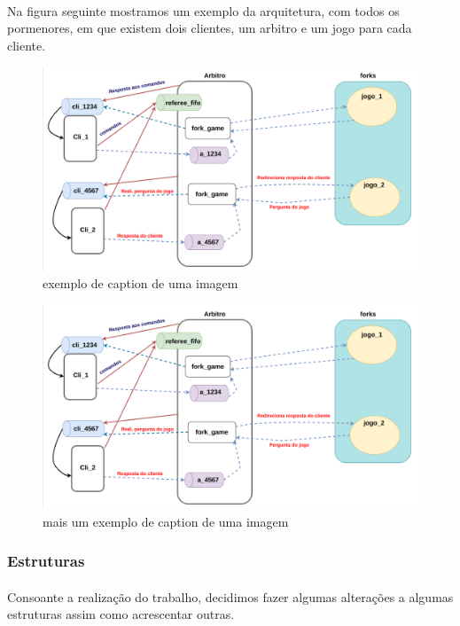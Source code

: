 \documentclass[letterpaper, 11pt]{article}
\begin{document}
\paragraph{}
Na figura seguinte mostramos um exemplo da arquitetura, com todos os pormenores, em que existem dois clientes, um arbitro e um jogo para cada cliente.


\begin{figure}[htbp]
\centering
\includegraphics[width=.9\linewidth]{images/esquema.png}
\caption{\label{fig:orgcb73477}
exemplo de caption de uma imagem}
\end{figure}

\begin{figure}[htbp]
\centering
\includegraphics[width=.9\linewidth]{images/esquema.png}
\caption{\label{fig:org50d2e40}
mais um exemplo de caption de uma imagem}
\end{figure}



\subsubsection{Estruturas}
\label{sec:org0d6cf94}

\paragraph{}
Consoante a realização do trabalho, decidimos fazer algumas alterações a algumas estruturas assim como acrescentar outras.
\end{document}
